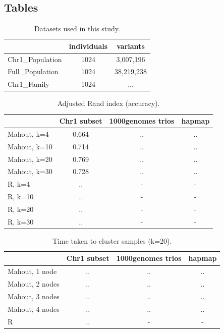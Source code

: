 \documentclass[twocolumn]{bmcart}%
\newcommand{\chrOnePop}{Chr1\_Population}
\newcommand{\FullPop}{Full\_Population}
\newcommand{\FullFam}{Chr1\_Family}
\begin{document}
\begin{backmatter}
\section*{Tables}
\begin{table}[h!]
\caption{Datasets used in this study.}
      \begin{tabular}{lcc}
        \hline
           & individuals  & variants  \\ \hline
        \chrOnePop & 1024 & 3,007,196 \\
        \FullPop\ & 1024 & 38,219,238 \\
        \FullFam\ & 1024 & ...\\
      \end{tabular}
      \label{datasets}
\end{table}

\begin{table}[h!]
\caption{Adjusted Rand index (accuracy).}
      \begin{tabular}{lccc}
        \hline
           & Chr1 subset & 1000genomes trios  & hapmap \\ \hline
        Mahout, k=4 & 0.664 & ..&..\\
        Mahout, k=10 & 0.714 & ..&..\\
        Mahout, k=20 & 0.769 & .. & ..\\ 
        Mahout, k=30 & 0.728 & .. & ..\\ 
        R, k=4 & .. & - & -\\
        R, k=10 & .. & - & -\\
        R, k=20 & .. & - & -\\ 
        R, k=30 & .. & - & -\\ \hline
      \end{tabular}
      \label{datasetsAcc}
\end{table}

\begin{table}[h!]
\caption{Time taken to cluster samples (k=20).}
      \begin{tabular}{lccc}
        \hline
           & Chr1 subset & 1000genomes trios  & hapmap \\ \hline
        Mahout, 1 node & .. & ..&..\\
        Mahout, 2 nodes & .. & ..&..\\
        Mahout, 3 nodes & .. & .. & ..\\ 
        Mahout, 4 nodes & .. & .. & ..\\ 
        R & .. & - & -\\ \hline
      \end{tabular}
      \label{datasetsTime}
\end{table}



\end{backmatter}
\end{document}

